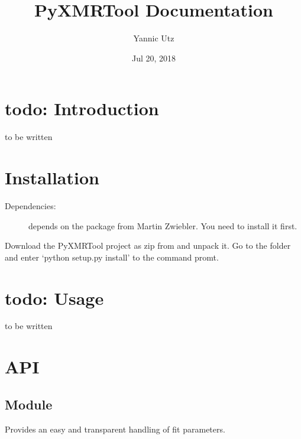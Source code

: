 \documentclass[letterpaper,10pt,english]{sphinxmanual}
\title{PyXMRTool Documentation}
\date{Jul 20, 2018}
\author{Yannic Utz}
\begin{document}
\maketitle
\sphinxtableofcontents
{}\label{\detokenize{index::doc}}



\chapter{todo: Introduction}
\label{\detokenize{intro:todo-introduction}}\label{\detokenize{intro::doc}}
to be written


\chapter{Installation}
\label{\detokenize{install:installation}}\label{\detokenize{install::doc}}\begin{description}
\item[{Dependencies:}] \leavevmode
{} depends on the package  from Martin Zwiebler.
You need to install it first.

\end{description}

Download the PyXMRTool project as zip from  and unpack it.
Go to the folder and enter ‘python setup.py install’ to the command promt.


\chapter{todo: Usage}
\label{\detokenize{usage:todo-usage}}\label{\detokenize{usage::doc}}
to be written


\chapter{API}
\label{\detokenize{api:api}}\label{\detokenize{api::doc}}

\section{Module }
\label{\detokenize{modules-api/parameters:module-Parameters}}\label{\detokenize{modules-api/parameters:module-parameters}}\label{\detokenize{modules-api/parameters::doc}}
Provides an easy and transparent handling of fit parameters.
\end{document}
